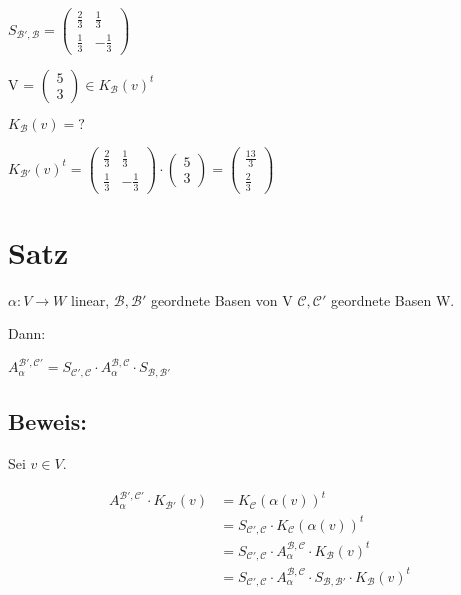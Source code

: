 \documentclass[a4paper, openany]{book}
\begin{document}
        $S_{\mathcal{B', B}} = \begin{pmatrix}\frac{2}{3} & \frac{1}{3} \\ \frac{1}{3} & - \frac{1}{3} \end{pmatrix}$

        V = $\begin{pmatrix}5 \\ 3 \end{pmatrix} \in K_{\mathcal{B}} (v)^t$

        $K_{\mathcal{B}}(v) = ?$

        $K_{\mathcal{B'}}(v)^t = \begin{pmatrix}\frac{2}{3} & \frac{1}{3} \\ \frac{1}{3} & - \frac{1}{3} \end{pmatrix} \cdot \begin{pmatrix}5 \\ 3 \end{pmatrix} = \begin{pmatrix}\frac{13}{3} \\ \frac{2}{3} \end{pmatrix}$

        \section{Satz}

        $\alpha : V \rightarrow W$ linear, $\mathcal{B, B'}$ geordnete Basen von V $\mathcal{C, C'}$ geordnete Basen W.

        Dann:

        \begin{center}
          $A_{\alpha}^{\mathcal{B', C'}} = S_{\mathcal{C', C}} \cdot A_{\alpha}^{\mathcal{B,C}} \cdot S_{\mathcal{B, B'}}$
        \end{center}

        \subsection{Beweis:}

        Sei $v \in V$.

        \begin{align*}
        A_{\alpha}^{\mathcal{B', C'}} \cdot K_{\mathcal{B'}}(v) & = K_{\mathcal{C}}(\alpha(v))^t  \\
                                                                & = S_{\mathcal{C', C}} \cdot K_{\mathcal{C}}(\alpha(v))^t \\
                                                                & = S_{\mathcal{C', C}} \cdot A_{\alpha}^{\mathcal{B, C}} \cdot K_{\mathcal{B}}(v)^t \\
                                                                & = S_{\mathcal{C', C}} \cdot A_{\alpha}^{\mathcal{B, C}} \cdot S_{\mathcal{B, B'}} \cdot K_{\mathcal{B}}(v)^t
        \end{align*}
\end{document}
